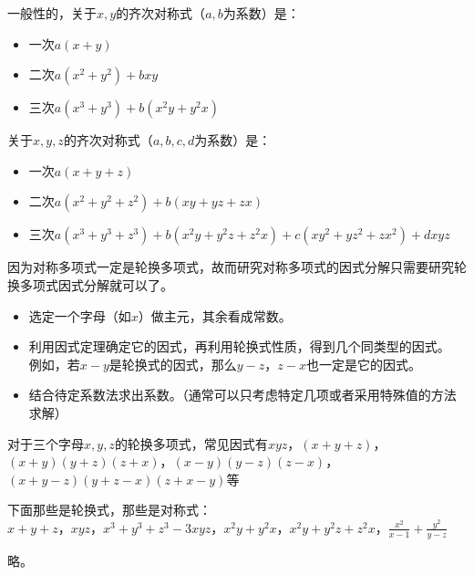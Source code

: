 \documentclass[windows,csize4]{BHCexam}
\begin{document}
\begin{groups}
    一般性的，关于$x,y$的齐次对称式（$a,b$为系数）是：
    \begin{itemize}
        \item 一次$a(x+y)$
        \item 二次$a(x^2+y^2)+bxy$
        \item 三次$a(x^3+y^3)+b(x^2y+y^2x)$
    \end{itemize}
    关于$x,y,z$的齐次对称式（$a,b,c,d$为系数）是：
    \begin{itemize}
        \item 一次$a(x+y+z)$
        \item 二次$a(x^2+y^2+z^2)+b(xy+yz+zx)$
        \item 三次$a(x^3+y^3+z^3)+b(x^2y+y^2z+z^2x)+c(xy^2+yz^2+zx^2)+dxyz$
    \end{itemize}

    因为对称多项式一定是轮换多项式，故而研究对称多项式的因式分解只需要研究轮换多项式因式分解就可以了。
    \begin{itemize}
        \item 选定一个字母（如$x$）做主元，其余看成常数。
        \item 利用因式定理确定它的因式，再利用轮换式性质，得到几个同类型的因式。
              例如，若$x-y$是轮换式的因式，那么$y-z$，$z-x$也一定是它的因式。
        \item 结合待定系数法求出系数。（通常可以只考虑特定几项或者采用特殊值的方法求解）
    \end{itemize}
    对于三个字母$x,y,z$的轮换多项式，常见因式有$xyz$，$(x+y+z)$，$(x+y)(y+z)(z+x)$，$(x-y)(y-z)(z-x)$，
    $(x+y-z)(y+z-x)(z+x-y)$等


    \begin{questions}[]
        \question[5] 下面那些是轮换式，那些是对称式：\\
        $x+y+z$，$xyz$，$x^3+y^3+z^3-3xyz$，$x^2y+y^2x$，$x^2y+y^2z+z^2x$，$\frac{x^2}{x-1}+\frac{y^2}{y-z}$
        \begin{solution}{0.5cm}
            \methodonly 略。
        \end{solution}
        \vspace{3.5cm}


\end{questions}
\end{groups}
\end{document}
